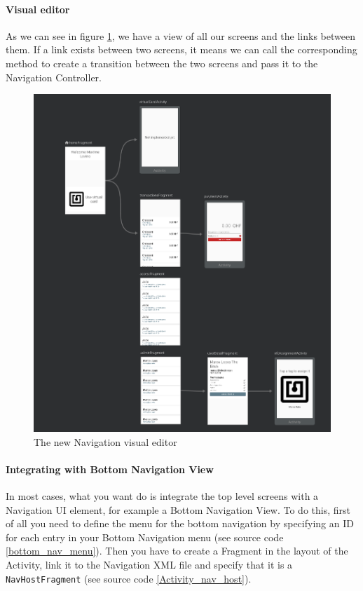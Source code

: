 \documentclass[11pt,a4paper]{report}
\newenvironment{code}{\captionsetup{type=listing}}{}
\begin{document}
\paragraph{Visual editor}
As we can see in figure \ref{navigation_editor}, we have a view of all our screens and the links between them. If a link exists between two screens, it means we can call the corresponding method to create a transition between the two screens and pass it to the Navigation Controller.\\

\begin{figure}[H]
\begin{center}
	\includegraphics[width=.8\textwidth]{assets/navEditor}
	\caption[Navigation visual editor]{The new Navigation visual editor}
	\label{navigation_editor}
\end{center}
\end{figure}

\paragraph{Integrating with Bottom Navigation View}
In most cases, what you want do is integrate the top level screens with a Navigation UI element, for example a Bottom Navigation View\cite{android:doc:material:bottom_nav}. To do this, first of all you need to define the menu for the bottom navigation by specifying an ID for each entry in your Bottom Navigation menu (see source code \ref{bottom_nav_menu}). Then you have to create a Fragment in the layout of the Activity, link it to the Navigation XML file and specify that it is a \verb+NavHostFragment+ (see source code \ref{Activity_nav_host}).
\begin{code}
	\caption{Menu defining the bottom navigation}
	\label{bottom_nav_menu}
\end{code}
\end{document}
